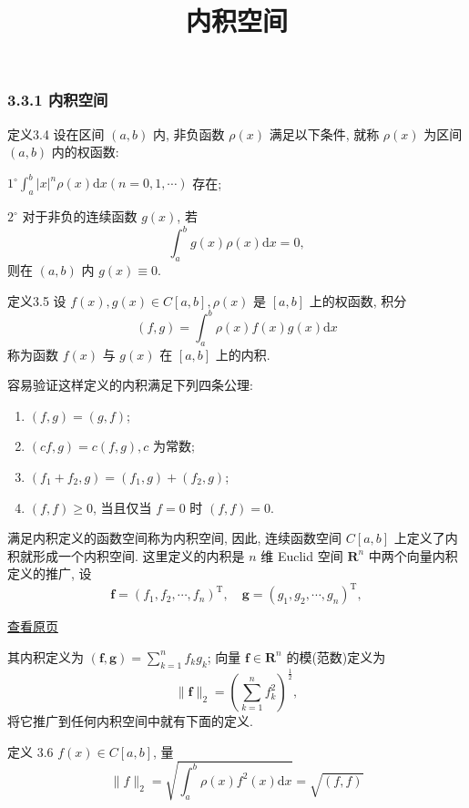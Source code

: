 \documentclass[
  10pt,
  fontset=fandol]{ctexart}
\title{内积空间}
\author{}
\date{}
\begin{document}
\maketitle

\subsubsection{3.3.1 内积空间}\label{ux5185ux79efux7a7aux95f4}

定义3.4 设在区间 \((a,b)\) 内, 非负函数 \(\rho(x)\) 满足以下条件, 就称 \(\rho(x)\) 为区间 \((a,b)\) 内的权函数:

\(1^\circ \int_a^b |x|^n \rho(x) \mathrm{d}x (n = 0,1,\cdots)\) 存在;

\(2^\circ\) 对于非负的连续函数 \(g(x)\), 若 \[
\int_a^b g(x) \rho(x) \mathrm{d}x = 0, \tag{3.3.2}
\] 则在 \((a,b)\) 内 \(g(x) \equiv 0\).

定义3.5 设 \(f(x), g(x) \in C[a,b], \rho(x)\) 是 \([a,b]\) 上的权函数, 积分 \[
(f,g) = \int_a^b \rho(x) f(x) g(x) \mathrm{d}x \tag{3.3.3}
\] 称为函数 \(f(x)\) 与 \(g(x)\) 在 \([a,b]\) 上的内积.

容易验证这样定义的内积满足下列四条公理:

\begin{enumerate}
\def\labelenumi{(\arabic{enumi})}
\item
  \((f,g) = (g,f)\);
\item
  \((cf,g) = c(f,g), c\) 为常数;
\item
  \((f_1 + f_2, g) = (f_1, g) + (f_2, g)\);
\item
  \((f,f) \geqslant 0\), 当且仅当 \(f=0\) 时 \((f,f)=0\).
\end{enumerate}

满足内积定义的函数空间称为内积空间, 因此, 连续函数空间 \(C[a,b]\) 上定义了内积就形成一个内积空间. 这里定义的内积是 \(n\) 维 Euclid 空间 \(\mathbf{R}^n\) 中两个向量内积定义的推广, 设 \[
\boldsymbol{f} = (f_1, f_2, \cdots, f_n)^{\mathrm{T}}, \quad \boldsymbol{g} = (g_1, g_2, \cdots, g_n)^{\mathrm{T}},
\]

\href{../../source-images/pdf-066.jpeg}{查看原页}

其内积定义为 \((\boldsymbol{f}, \boldsymbol{g}) = \sum_{k=1}^{n} f_{k} g_{k}\); 向量 \(\boldsymbol{f} \in \mathbf{R}^{n}\) 的模(范数)定义为 \[
\| \boldsymbol{f} \|_{2} = \left( \sum_{k=1}^{n} f_{k}^{2} \right)^{\frac{1}{2}},
\] 将它推广到任何内积空间中就有下面的定义.

定义 3.6 \(f(x) \in C[a, b]\), 量 \[
\| f \|_{2} = \sqrt{\int_{a}^{b} \rho(x) f^{2}(x) \mathrm{d}x} = \sqrt{(f, f)} \tag{3.3.4}
\]
\end{document}

